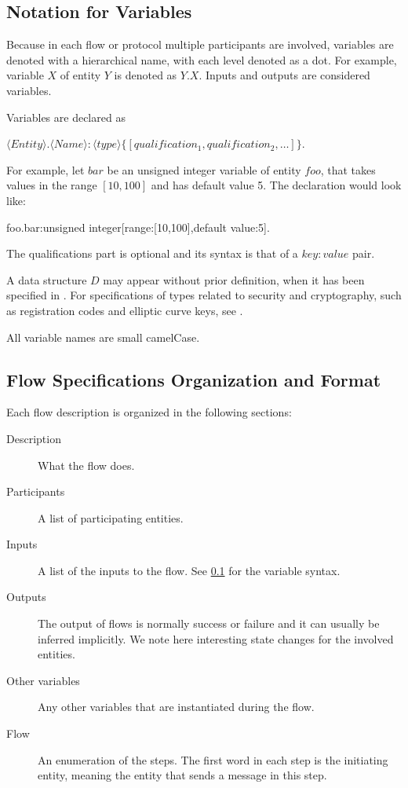 \documentclass[a4paper,10pt]{article}
\begin{document}
\subsection{Notation for Variables}
\label{sec:variable_notation}
Because in each flow or protocol multiple participants are involved, variables are denoted with a hierarchical name, with each level denoted as a dot. For example, variable $X$ of 
entity $Y$ is denoted as $Y.X$. Inputs and outputs are considered variables.

Variables are declared as
\begin{center}
$\langle Entity\rangle.\langle Name\rangle:\langle type\rangle\{[qualification_1, qualification_2, \dots]\}$.
\end{center}

For example, let $bar$ be an unsigned integer variable of entity $foo$, that takes values in the range $[10,100]$ and has default value 5. The declaration would look like:

\begin{center}
 foo.bar:unsigned integer[range:[10,100],default value:5].
\end{center}

The qualifications part is optional and its syntax is that of a $key:value$ pair.

A data structure $D$ may appear without prior definition, when it has been specified in \cite{data_structure_spec}. For specifications of types related to security and 
cryptography, such as registration codes and elliptic curve keys, see \cite{crypto_spec}.

All variable names are small camelCase.

\subsection{Flow Specifications Organization and Format}\label{sec:flow_spec_def}
Each flow description is organized in the following sections:

\begin{description}
 \item[Description] What the flow does.
 \item[Participants] A list of participating entities.
 \item[Inputs] A list of the inputs to the flow. See \ref{sec:variable_notation} for the variable syntax.
 \item[Outputs] The output of flows is normally success or failure and it can usually be inferred implicitly. We note here interesting state changes for the involved entities.
 \item[Other variables] Any other variables that are instantiated during the flow.
 \item[Flow] An enumeration of the steps. The first word in each step is the initiating entity, meaning the entity that sends a message in this step.
\end{description}
\end{document}
